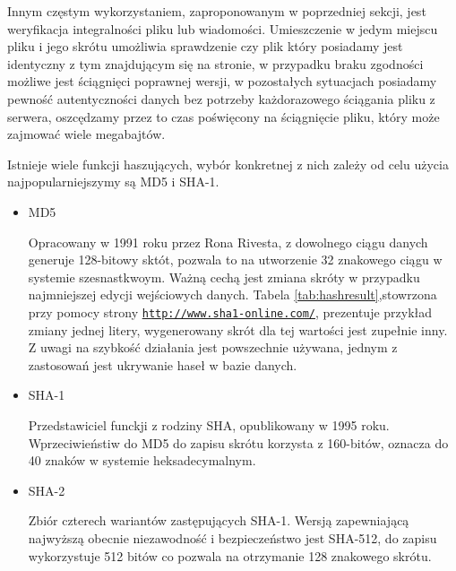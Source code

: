 Innym częstym wykorzystaniem, zaproponowanym w poprzedniej sekcji, jest weryfikacja integralności pliku lub wiadomości. Umieszczenie w jedym miejscu pliku i jego skrótu umożliwia sprawdzenie czy plik który posiadamy jest identyczny z tym znajdującym się na stronie, w przypadku braku zgodności możliwe jest ściągnięci poprawnej wersji, w pozostałych sytuacjach posiadamy pewność autentyczności danych bez potrzeby każdorazowego ściągania pliku z serwera, oszcędzamy przez to czas poświęcony na ściągnięcie pliku, który może zajmować wiele megabajtów.

Istnieje wiele funkcji haszujących, wybór konkretnej z nich zależy od celu użycia najpopularniejszymy są MD5 i SHA-1.

\begin{itemize}
\item
MD5

Opracowany w 1991 roku przez Rona Rivesta, z dowolnego ciągu danych generuje 128-bitowy sktót, pozwala to na utworzenie 32 znakowego ciągu w systemie szesnastkwoym. Ważną cechą jest zmiana skróty w przypadku najmniejszej edycji wejściowych danych. Tabela \ref{tab:hashresult},stowrzona przy pomocy strony \underline{\texttt{http://www.sha1-online.com/}}, prezentuje przykład zmiany jednej litery, wygenerowany skrót dla tej wartości jest zupełnie inny.
Z uwagi na szybkość działania jest powszechnie używana, jednym z zastosowań jest ukrywanie haseł w bazie danych.

\item
SHA-1

Przedstawiciel funckji z rodziny SHA, opublikowany w 1995 roku. Wprzeciwieństiw do MD5 do zapisu skrótu korzysta z 160-bitów, oznacza do 40 znaków w systemie heksadecymalnym.

\item
SHA-2

Zbiór czterech wariantów zastępujących SHA-1. Wersją zapewniającą najwyższą obecnie niezawodność i bezpieczeństwo jest SHA-512, do zapisu wykorzystuje 512 bitów co pozwala na otrzymanie 128 znakowego skrótu.

\end{itemize}

